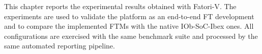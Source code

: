 This chapter reports the experimental results obtained with \ac{Fatori-V}. The experiments are used to validate the platform as an end-to-end \ac{FT} development and to compare the implemented \acp{FTM} with the native IOb-SoC-Ibex ones. All configurations are exercised with the same benchmark suite and processed by the same automated reporting pipeline. 